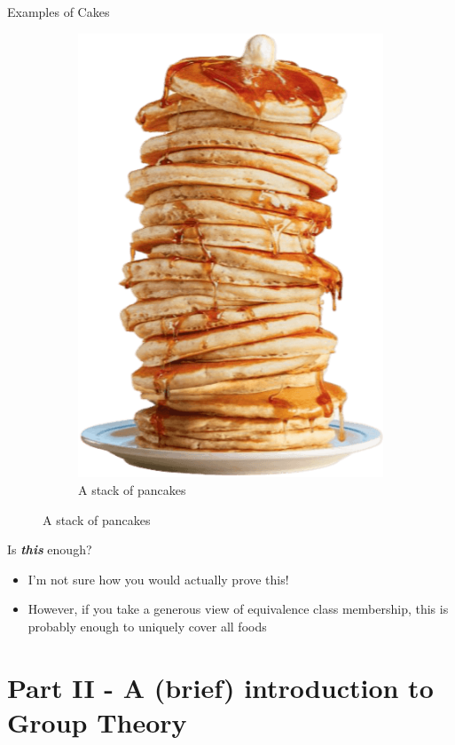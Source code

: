 \documentclass{beamer}
\begin{document}
\begin{frame}{Examples of Cakes}
\begin{figure}
\begin{subfigure}{.35\textwidth}
          \includegraphics[width=.8\linewidth]{cake/33_flapjacks.png}
          \caption{\label{fig:pancake-stack}A stack of pancakes}
        \end{subfigure}
    \end{figure}
\end{frame}


\begin{frame}{Is \textit{\textbf{this}} enough?}
    \begin{itemize}
        \item I'm not sure how you would actually prove this!
        \item However, if you take a generous view of equivalence class membership, this is probably enough to uniquely cover all foods
    \end{itemize}
\end{frame}


\section{Part II - A (brief) introduction to Group Theory}
\end{document}
